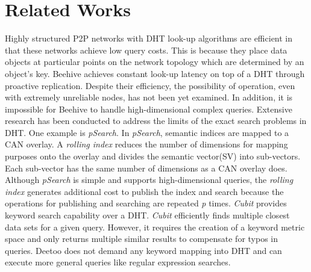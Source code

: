 \documentclass[conference]{IEEEtran}
\begin{document}
\section{Related Works}
\label{sec:related_works}
Highly structured P2P networks with DHT look-up algorithms 
\cite{is:Chord, sr:CAN, bz:Tapestry, pr:Symphony} 
are efficient in that these networks achieve low query costs. This is 
because they place data objects at particular points on the network topology
which are determined by an object's key. Beehive\cite{re:beehive04} 
achieves constant look-up latency on top of a
DHT through proactive replication. Despite their efficiency, the possibility 
of operation, even with extremely unreliable nodes, has not been yet
examined. In addition, it is impossible for Beehive to handle
high-dimensional complex queries.  Extensive research has been conducted 
to address the limits of the exact search problems in DHT.
One example is \emph{pSearch}.\cite{psearch}
In \emph{pSearch}, semantic indices are mapped to a CAN overlay. 
A \emph{rolling index} reduces the number of dimensions for mapping purposes 
onto the overlay and divides the semantic vector(SV) into sub-vectors. 
Each sub-vector has the same number of dimensions as a CAN overlay does.
Although \emph{pSearch} is simple and supports high-dimensional queries, 
the \emph{rolling index} generates additional cost to publish the index and search 
because the operations for publishing and searching are repeated \textit{p} times.
\emph{Cubit}\cite{cubit} provides keyword search capability over a DHT. \emph{Cubit} 
efficiently finds multiple closest data sets for a given query. However, 
it requires the creation of a keyword metric space and only returns multiple similar results
to compensate for typos in queries. Deetoo does not demand any keyword mapping 
into DHT and can execute more general queries like regular expression searches.
\end{document}

